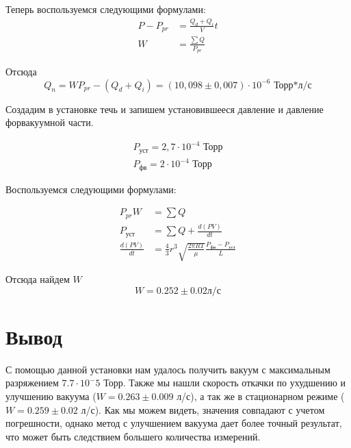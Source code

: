 \documentclass[12pt]{article}
\begin{document}
Теперь воспользуемся следующими формулами:
\begin{align*}
	P-P_{pr} &= \frac{Q_d+Q_i}{V}t\\
	W &= \frac{\sum Q}{P_{pr}}
\end{align*}

Отсюда \[Q_n = WP_{pr} - (Q_d+Q_i) = (10,098 \pm 0,007) \cdot 10^{-6} \text{ Торр*л/с} \]

Создадим в установке течь и запишем установившееся давление и давление форвакуумной части.

\begin{align*}
	P_\text{уст} = 2,7 \cdot 10^{-4} \text{ Торр}\\
	P_\text{фв} = 2 \cdot 10^{-4} \text{ Торр}
\end{align*}

Воспользуемся следующими формулами:

\begin{align*}
	P_{pr} W &= \sum{Q}\\
	P_\text{уст} &= \sum{Q} + \frac{d(PV)}{dt}\\
	\frac{d(PV)}{dt} &= \frac{4}{3}r^3\sqrt{\frac{2\pi RT}{\mu}}\frac{P_\text{фв} - P_\text{уст}}{L}
\end{align*}

Отсюда найдем $W$
\[
	W = 0.252 \pm 0.02 \text{л/с}
\]

\section{Вывод}

С помощью данной установки нам удалось получить вакуум с максимальным разряжением $7.7 \cdot 10^-5$ Торр. Также мы нашли скорость откачки по ухудшению и улучшению вакуума ($W = 0.263\pm0.009$ л/с), а так же в стационарном режиме ($W = 0.259\pm0.02$ л/с). Как мы можем видеть, значения совпадают с учетом погрешности, однако метод с улучшением вакуума дает более точный результат, что может быть следствием большего количества измерений.
\end{document}
